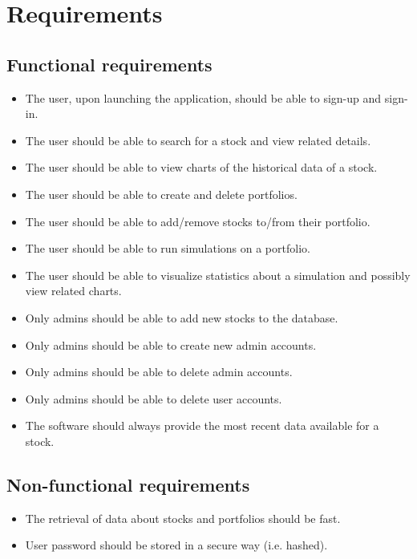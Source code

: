\section{Requirements}
\subsection{Functional requirements}
\begin{itemize}
	\item The user, upon launching the application, should be able to sign-up and sign-in.
	\item The user should be able to search for a stock and view related details.
	\item The user should be able to view charts of the historical data of a stock.
	\item The user should be able to create and delete portfolios.
	\item The user should be able to add/remove stocks to/from their portfolio.
	\item The user should be able to run simulations on a portfolio.
	\item The user should be able to visualize statistics about a simulation and possibly view related charts.
	\item Only admins should be able to add new stocks to the database.
	\item Only admins should be able to create new admin accounts.
	\item Only admins should be able to delete admin accounts.
	\item Only admins should be able to delete user accounts.
	\item The software should always provide the most recent data available for a stock.
\end{itemize}

\subsection{Non-functional requirements}
\begin{itemize}
	\item The retrieval of data about stocks and portfolios should be fast.
	\item User password should be stored in a secure way (i.e. hashed).
\end{itemize}

